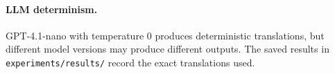 \documentclass[11pt,a4paper]{article}
\begin{document}
\begin{appendices}
\paragraph{LLM determinism.}
GPT-4.1-nano with temperature 0 produces deterministic translations,
but different model versions may produce different outputs.  The saved
results in \texttt{experiments/results/} record the exact translations
used.


\end{appendices}
\end{document}
